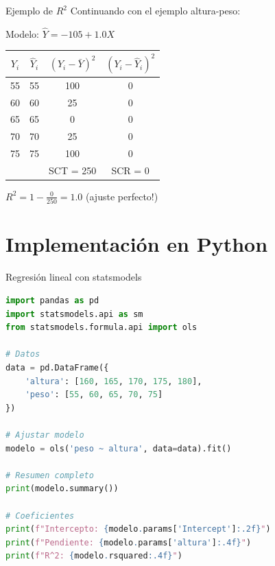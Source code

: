 \documentclass[aspectratio=169]{beamer}
\begin{document}
\begin{frame}{Ejemplo de $R^2$}
Continuando con el ejemplo altura-peso:

\vspace{0.3cm}
Modelo: $\hat{Y} = -105 + 1.0 X$

\begin{table}
\centering
\begin{tabular}{cccc}
\toprule
$Y_i$ & $\hat{Y}_i$ & $(Y_i - \bar{Y})^2$ & $(Y_i - \hat{Y}_i)^2$ \\
\midrule
55 & 55 & 100 & 0 \\
60 & 60 & 25 & 0 \\
65 & 65 & 0 & 0 \\
70 & 70 & 25 & 0 \\
75 & 75 & 100 & 0 \\
\midrule
& & SCT = 250 & SCR = 0 \\
\bottomrule
\end{tabular}
\end{table}

\vspace{0.3cm}
$R^2 = 1 - \frac{0}{250} = 1.0$ (ajuste perfecto!)
\end{frame}

\section{Implementación en Python}

\begin{frame}[fragile]{Regresión lineal con statsmodels}
\begin{lstlisting}[language=Python]
import pandas as pd
import statsmodels.api as sm
from statsmodels.formula.api import ols

# Datos
data = pd.DataFrame({
    'altura': [160, 165, 170, 175, 180],
    'peso': [55, 60, 65, 70, 75]
})

# Ajustar modelo
modelo = ols('peso ~ altura', data=data).fit()

# Resumen completo
print(modelo.summary())

# Coeficientes
print(f"Intercepto: {modelo.params['Intercept']:.2f}")
print(f"Pendiente: {modelo.params['altura']:.4f}")
print(f"R^2: {modelo.rsquared:.4f}")
\end{lstlisting}
\end{frame}
\end{document}
